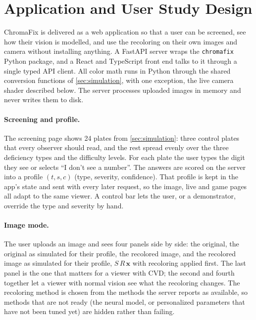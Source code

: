 \section{Application and User Study Design}
\label{sec:app}

ChromaFix is delivered as a web application so that a user can be screened, see how their
vision is modelled, and use the recoloring on their own images and camera without installing
anything. A FastAPI server wraps the \texttt{chromafix} Python package, and a React and
TypeScript front end talks to it through a single typed API client. All color math runs in
Python through the shared conversion functions of \cref{sec:simulation}, with one exception, the live
camera shader described below. The server processes uploaded images in memory and never
writes them to disk.

\paragraph{Screening and profile.}
The screening page shows 24 plates from \cref{sec:simulation}: three control plates that every
observer should read, and the rest spread evenly over the three deficiency types and the
difficulty levels. For each plate the user types the digit they see or selects ``I don't see a
number''. The answers are scored on the server into a profile $(t, s, c)$ (type, severity,
confidence). That profile is kept in the app's state and sent with every later request, so the
image, live and game pages all adapt to the same viewer. A control bar lets the user, or a
demonstrator, override the type and severity by hand.

\paragraph{Image mode.}
The user uploads an image and sees four panels side by side: the original, the original as
simulated for their profile, the recolored image, and the recolored image as simulated for
their profile, \ie $S\,R\,\mathbf{x}$ with recoloring applied first. The last panel is the one
that matters for a viewer with CVD; the second and fourth together let a viewer with normal
vision see what the recoloring changes. The recoloring method is chosen from the methods the
server reports as available, so methods that are not ready (the neural model, or personalized
parameters that have not been tuned yet) are hidden rather than failing.

